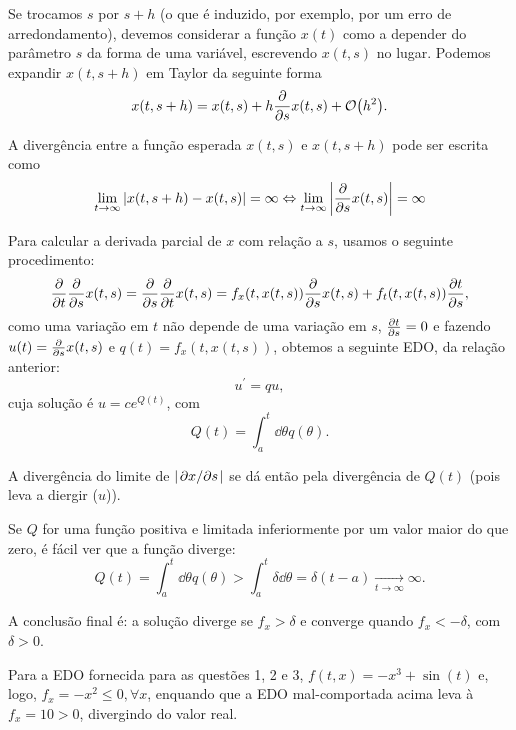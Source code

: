   Se trocamos $s$ por $s+h$ (o que é induzido, por exemplo, por um erro de arredondamento), devemos considerar a função $x(t)$ como a depender do parâmetro $s$ da forma de uma variável, escrevendo $x(t, s)$ no lugar. Podemos expandir $x(t, s+h)$ em Taylor da seguinte forma
  \begin{equation*}
    x(t, s+h) = x(t,s) + h \pdv{s} x(t, s) + \order{h^2}.
  \end{equation*}

  A divergência entre a função esperada $x(t, s)$ e $x(t, s+h)$ pode ser escrita como
  \begin{equation*}
    \lim_{t \to \infty} \abs{x(t, s+h) - x(t,s)} = \infty \Leftrightarrow \lim_{t \to \infty} \abs{\pdv{s} x(t, s)} = \infty
  \end{equation*}

  Para calcular a derivada parcial de $x$ com relação a $s$, usamos o seguinte procedimento:
  \begin{equation*}
    \pdv{t} \pdv{s} x(t, s) = \pdv{s} \pdv{t} x(t,s) = f_x(t, x(t,s)) \pdv{s} x(t,s) + f_t(t, x(t,s)) \pdv{t}{s},
  \end{equation*}
  como uma variação em $t$ não depende de uma variação em $s$, $\pdv{t}{s} = 0$ e fazendo $u(t) = \pdv{s} x(t,s)$ e $q(t) = f_x(t, x(t,s))$, obtemos a seguinte EDO, da relação anterior:
  \begin{equation*}
    u^\prime = q u ,
  \end{equation*}
  cuja solução é $u = c e^{Q(t)}$, com
  \begin{equation*}
    Q(t) = \int_a^t \dd{\theta} q(\theta).
  \end{equation*}

  A divergência do limite de $\abs{\pdv*{x}{s}}$ se dá então pela divergência de $Q(t)$ (pois leva a diergir ($u$)).

  Se $Q$ for uma função positiva e limitada inferiormente por um valor maior do que zero, é fácil ver que a função diverge:
  \begin{equation*}
    Q(t) = \int_a^t \dd{\theta} q(\theta) > \int_a^t \delta \dd{\theta} = \delta (t-a) \xrightarrow[t \to \infty]{} \infty.
  \end{equation*}

  A conclusão final é: a solução diverge se $f_x > \delta$ e converge quando $f_x < - \delta$, com $\delta > 0$.

  Para a EDO fornecida para as questões 1, 2 e 3, $f(t, x) = - x^3 + \sin(t)$ e, logo, $f_x = -x^2 \leq 0, \forall x$, enquando que a EDO mal-comportada acima leva à $f_x = 10 > 0$, divergindo do valor real.


